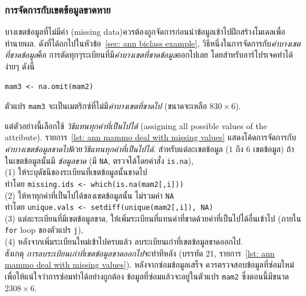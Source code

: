 \subsubsection{การจัดการกับเขตข้อมูลขาดหาย}

บางเขตข้อมูลที่ไม่มีค่า (missing data)ควรต้องถูกจัดการก่อนนำข้อมูลเข้าไปฝึกสร้างโมเดลเพื่อทำนายผล.
ดังที่ได้ถกไปในหัวข้อ~\ref{sec: ann biclass example}, 
วิธีหนึ่งในการจัดการกับ\textit{ค่าบางเขตที่ขาดข้อมูล}คือ การตัดทุกๆระเบียนที่มี\textit{ค่าบางเขตที่ขาดข้อมูล}ออกไปเลย 
โดยสำหรับอาร์โปรเจคทำได้ง่ายๆ ดังนี้
\begin{verbatim}
mam3 <- na.omit(mam2)
\end{verbatim}
ตัวแปร \texttt{mam3} จะเป็นเมตริกซ์ที่ไม่มี\textit{ค่าบางเขตที่ขาดไป} (ขนาดจะเหลือ $830 \times 6$).

แต่ตัวอย่างนี้เลือกใช้%
\textit{วิธีแทนทุกค่าที่เป็นไปได้} (assigning all possible values of the attribute).
รายการ~\ref{lst: ann mammo deal with missing values} แสดงโค้ดการจัดการกับ\textit{ค่าบางเขตข้อมูลขาดไป}ด้วย\textit{วิธีแทนทุกค่าที่เป็นไปได้}.
สำหรับแต่ละเขตข้อมูล ($1$ ถึง $6$ เขตข้อมูล) ถ้าในเขตข้อมูลนั้นมี \textit{ข้อมูลขาด} (มี \texttt{NA}, ตรวจได้โดยคำสั่ง \texttt{is.na}), \\
(1) ให้ระบุดัชนีของระเบียนที่เขตข้อมูลนั้นขาดไป \\
ทำโดย \texttt{missing.ids <- which(is.na(mam2[,i]))}\\
(2) ให้หาทุกค่าที่เป็นไปได้ของเขตข้อมูลนั้น ไม่รวมค่า \texttt{NA}\\
ทำโดย \texttt{unique.vals <- setdiff(unique(mam2[,i]), NA)}\\
(3) แต่ละระเบียนที่มีเขตข้อมูลขาด, ให้เพิ่มระเบียนที่แทนค่าที่ขาดด้วยค่าที่เป็นไปได้อื่นเข้าไป (ภายใน \texttt{for} loop ของตัวแปร \texttt{j}),\\
(4) หลังจากเพิ่มระเบียนใหม่เข้าไปครบแล้ว ลบระเบียนเก่าที่เขตข้อมูลขาดออกไป.\\
%
สังเกตุ \textit{การลบระเบียนเก่าที่เขตข้อมูลขาดออกไป}จะทำทีหลัง (บรรทัด 21, รายการ~\ref{lst: ann mammo deal with missing values}).
หลังจากซ่อมข้อมูลเสร็จ ควรตรวจสอบข้อมูลที่ซ่อมใหม่ เพื่อให้แน่ใจว่าการซ่อมทำได้อย่างถูกต้อง
ข้อมูลที่ซ่อมแล้วจะอยู่ในตัวแปร \texttt{mam2} ซึ่งตอนนี้มีขนาด $2308 \times 6$.

